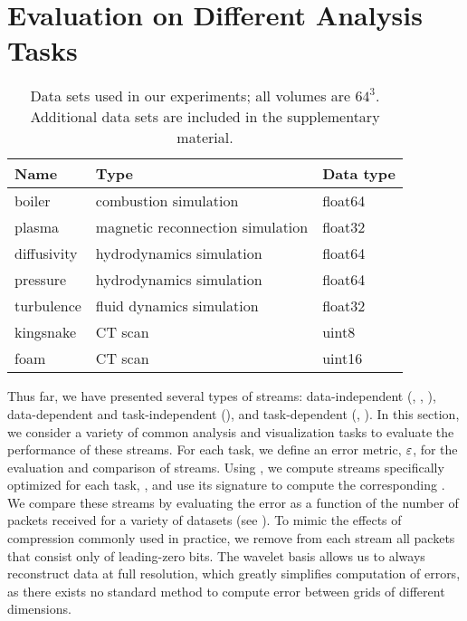 \section{Evaluation on Different Analysis Tasks} \label{sec:analysis-tasks}

\begin{table}[b]
  \centering
	\begin{tabular}{l l l}
  \toprule
  Name & Type & Data type \\
  \midrule
  boiler & combustion simulation& float64\\
  plasma & magnetic reconnection simulation& float32\\
  diffusivity & hydrodynamics simulation& float64\\
  pressure & hydrodynamics simulation& float64\\
	turbulence & fluid dynamics simulation& float32\\
	kingsnake & CT scan & uint8\\
	foam & CT scan & uint16\\
  \bottomrule
  \end{tabular}\label{tbl:data-sets}
  \vspace{-0.5em}
   \caption{Data sets used in our experiments; all volumes are $64^3$. Additional data sets are 
   included in the supplementary material.}
\end{table}

Thus far, we have presented several types of streams: data-independent (\slvl, \sbit, \swav),
data-dependent and task-independent (\smag), and task-dependent (\sopt, \ssig). In this section, we
consider a variety of common analysis and visualization tasks to evaluate the performance of these
streams. For each task, we define an error metric, $\err$, for the evaluation and comparison of
streams. Using , we compute streams specifically optimized for each task, \stkop,
and use its signature to compute the corresponding \stksg. We compare these streams by evaluating
the error as a function of the number of packets received for a variety of datasets (see
). To mimic the effects of compression commonly used in practice, we remove from
each stream all packets that consist only of leading-zero bits. The wavelet basis allows us to
always reconstruct data at full resolution, which greatly simplifies computation of errors, as there
exists no standard method to compute error between grids of different dimensions.

